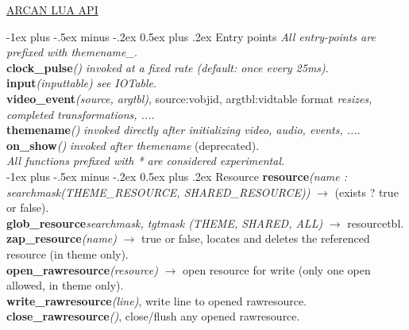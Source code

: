 \documentclass[10pt,landscape]{article}
\makeatletter
\renewcommand{\section}{\@startsection{section}{1}{0mm}%
                                {-1ex plus -.5ex minus -.2ex}%
                                {0.5ex plus .2ex}%
                                {\normalfont\large\bfseries}}
\makeatother
\begin{document}
\raggedright
\footnotesize
\begin{multicols}{3}

\setlength{\premulticols}{1pt}
\setlength{\postmulticols}{1pt}
\setlength{\multicolsep}{1pt}
\setlength{\columnsep}{2pt}

\begin{center}
     \Large{\underline{ARCAN LUA API}} \
\end{center}

\section{Entry points}
	\emph{All entry-points are prefixed with themename\_}.\\

	\textbf{clock\_pulse}\emph{()} \emph{invoked at a fixed rate (default: once every 25ms)}.\\
	\textbf{input}\emph{(inputtable)} \emph{see IOTable}.\\
	\textbf{video\_event}\emph{(source, argtbl)}, source:vobjid, argtbl:vidtable format \emph{resizes, completed transformations, ...}.\\
	\textbf{themename}\emph{()}	\emph{invoked directly after initializing video, audio, events, ...}.\\
	\textbf{on\_show}\emph{()} \emph{invoked after themename} (deprecated).\\

	\emph{All functions prefixed with * are considered experimental.}\\
\section{Resource}
		\textbf{resource}\emph{(name : searchmask(THEME\_RESOURCE, SHARED\_RESOURCE))} $\rightarrow$ (exists ? true or false).\\
		\textbf{glob\_resource}\emph{searchmask, tgtmask (THEME, SHARED, ALL)} $\rightarrow$ resourcetbl.\\
		\textbf{zap\_resource}\emph{(name)} $\rightarrow$ true or false, locates and deletes the referenced resource (in theme only).\\
		\textbf{open\_rawresource}\emph{(resource)} $\rightarrow$ open resource for write (only one open allowed, in theme only).\\
		\textbf{write\_rawresource}\emph{(line)}, write line to opened rawresource.\\
		\textbf{close\_rawresource}\emph{()}, close/flush any opened rawresource.\\
		

\end{multicols}
\end{document}
